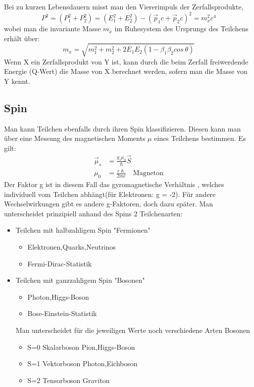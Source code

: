 \documentclass[Ex4_Zusammenfassung.tex]{subfiles}
\begin{document}
Bei zu kurzen Lebensdauern misst man den Viererimpuls der Zerfallsprodukte,
\begin{equation}
P^2 = (P_1^2 + P_2^2) = (E_1^2 + E_2^2) - (\vec p_1 c + \vec p_2 c)^2 = m_x^2 c^4
\end{equation}
wobei man die invariante Masse $ m_x $ im Ruhesystem des Ursprungs des Teilchens erhält über: 
\begin{equation}
m_x = \sqrt{m_1^2 + m_2^2 + 2E_1E_2(1-\beta_{1} \beta_{2} cos \ \theta ) }
\end{equation}
Wenn X ein Zerfallsprodukt von Y ist, kann durch die beim Zerfall freiwerdende Energie (Q-Wert) die Masse von X berechnet werden, sofern man die Masse von Y kennt.

\subsection{Spin}
Man kann Teilchen ebenfalls durch ihren Spin klassifizieren. 
Diesen kann man über eine Messung des magnetischen Moments $ \mu $ eines Teilchens bestimmen. Es gilt: 
\begin{align}
\vec \mu_{s} &= \frac{g_s \mu_0 } {\hslash} \vec S \\
\mu_{0} &= \frac{e \hslash}{2mc} \quad \text{Magneton}
\end{align}
Der Faktor g ist in diesem Fall das gyromagnetische Verhältnis , welches individuell vom Teilchen abhängt(für Elektronen: g = -2). Für andere Wechselwirkungen gibt es andere g-Faktoren, doch dazu später.\newline
Man unterscheidet prinzipiell anhand des Spins 2 Teilchenarten: 
\begin{itemize}
\item Teilchen mit halbzahligem Spin "Fermionen" 
						\begin{itemize}
						\item Elektronen,Quarks,Neutrinos
						\item Fermi-Dirac-Statistik
						\end{itemize}
\item Teilchen mit ganzzahligem Spin "Bosonen"
						\begin{itemize}
						\item Photon,Higgs-Boson
						\item Bose-Einstein-Statistik
						\end{itemize}
	Man unterscheidet für die jeweiligen Werte noch verschiedene Arten Bosonen
						\begin{itemize}
						\item S=0 \qquad Skalarboson \qquad Pion,Higgs-Boson
						\item S=1 \qquad Vektorboson \qquad Photon,Eichboson
						\item S=2 \qquad Tensorboson \qquad Graviton
						\end{itemize}
\end{itemize} 
\end{document}
